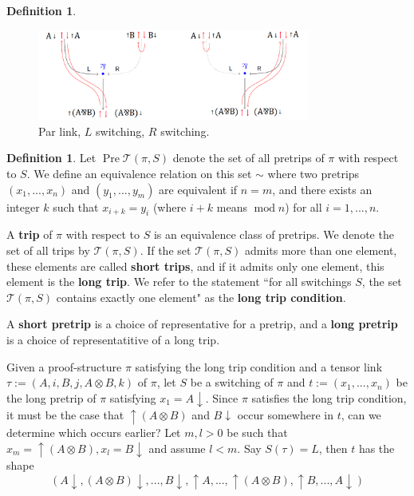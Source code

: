\documentclass[12pt]{article}
\theoremstyle{plain}
\theoremstyle{definition}
\newtheorem{defn}[thm]{Definition} %
\newcommand{\call}[1]{\mathcal{#1}}
\begin{document}
\begin{defn}
\begin{figure}[h]
    \centering
    \includegraphics[width = 0.8\textwidth]{ParrSwitching.png}
    \caption{Par link, $L$ switching, $R$ switching.}
    \label{fig:parrswitching}
\end{figure}
\begin{defn}
Let $\operatorname{Pre}\call{T}(\pi,S)$ denote the set of all pretrips of $\pi$ with respect to $S$. We define an equivalence relation on this set $\sim$ where two pretrips $(x_1,...,x_n)$ and $(y_1,...,y_m)$ are equivalent if $n = m$, and there exists an integer $k$ such that $x_{i + k} = y_i$ (where $i + k$ means $\operatorname{mod} n$) for all $i = 1,...,n$.

A \textbf{trip} of $\pi$ with respect to $S$ is an equivalence class of pretrips. We denote the set of all trips by $\call{T}(\pi,S)$.  If the set $\call{T}(\pi,S)$ admits more than one element, these elements are called \textbf{short trips}, and if it admits only one element, this element is the \textbf{long trip}. We refer to the statement ``for all switchings $S$, the set $\call{T}(\pi,S)$ contains exactly one element" as the \textbf{long trip condition}.

A \textbf{short pretrip} is a choice of representative for a pretrip, and a \textbf{long pretrip} is a choice of representatitive of a long trip.
\end{defn}

\end{defn}
Given a proof-structure $\pi$ satisfying the long trip condition and a tensor link $\tau := (A,i,B,j, A \otimes B,k)$ of $\pi$, let $S$ be a switching of $\pi$ and $t := (x_1,...,x_n)$ be the long pretrip of $\pi$ satisfying $x_1 =A\downarrow$. Since $\pi$ satisfies the long trip condition, it must be the case that $\uparrow (A \otimes B)$ and $B\downarrow$ occur somewhere in $t$, can we determine which occurs earlier? Let $m,l > 0$ be such that $x_m = \uparrow (A \otimes B), x_l = B\downarrow$ and assume $l < m$. Say $S(\tau) = L$, then $t$ has the shape
\begin{equation}\label{eq:sequence_left_switch_tensor}
    (A\downarrow, (A \otimes B)\downarrow, ..., B \downarrow, \uparrow A, ..., \uparrow (A \otimes B), \uparrow B, ..., A\downarrow)
\end{equation}
\end{document}
